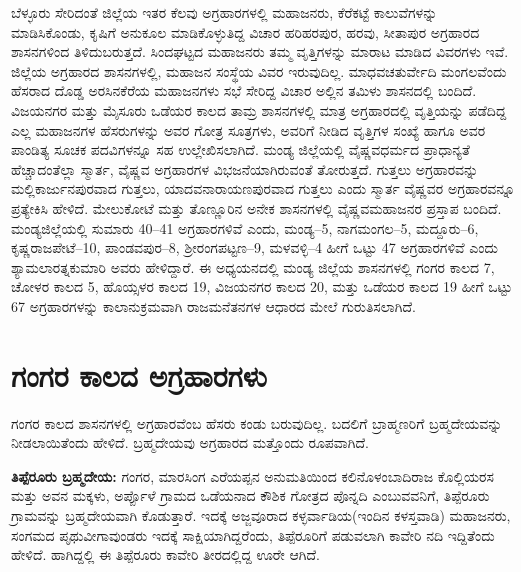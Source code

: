 ಬೆಳ್ಳೂರು ಸೇರಿದಂತೆ ಜಿಲ್ಲೆಯ ಇತರ ಕೆಲವು ಅಗ್ರಹಾರಗಳಲ್ಲಿ ಮಹಾಜನರು, ಕೆರೆಕಟ್ಟೆ ಕಾಲುವೆಗಳನ್ನು ಮಾಡಿಸಿಕೊಂಡು, ಕೃಷಿಗೆ ಅನುಕೂಲ ಮಾಡಿಕೊಳ್ಳುತಿದ್ದ ವಿಚಾರ ಹರಿಹರಪುರ, ಹರವು, ಸೀತಾಪುರ ಅಗ್ರಹಾರದ ಶಾಸನಗಳಿಂದ ತಿಳಿದುಬರುತ್ತದೆ. ಸಿಂದಘಟ್ಟದ ಮಹಾಜನರು ತಮ್ಮ ವೃತ್ತಿಗಳನ್ನು ಮಾರಾಟ ಮಾಡಿದ ವಿವರಗಳು ಇವೆ. ಜಿಲ್ಲೆಯ ಅಗ್ರಹಾರದ ಶಾಸನಗಳಲ್ಲಿ, ಮಹಾಜನ ಸಂಸ್ಥೆಯ ವಿವರ ಇರುವುದಿಲ್ಲ. ಮಾಧವಚತುರ್ವೇದಿ ಮಂಗಲವೆಂದು ಹೆಸರಾದ ದೊಡ್ಡ ಅರಸಿನಕೆರೆಯ ಮಹಾಜನಗಳು ಸಭೆ ಸೇರಿದ್ದ ವಿಚಾರ ಅಲ್ಲಿನ ತಮಿಳು ಶಾಸನದಲ್ಲಿ ಬಂದಿದೆ. ವಿಜಯನಗರ ಮತ್ತು ಮೈಸೂರು ಒಡೆಯರ ಕಾಲದ ತಾಮ್ರ ಶಾಸನಗಳಲ್ಲಿ ಮಾತ್ರ ಅಗ್ರಹಾರದಲ್ಲಿ ವೃತ್ತಿಯನ್ನು ಪಡೆದಿದ್ದ ಎಲ್ಲ ಮಹಾಜನಗಳ ಹೆಸರುಗಳನ್ನು ಅವರ ಗೋತ್ರ ಸೂತ್ರಗಳು, ಅವರಿಗೆ ನೀಡಿದ ವೃತ್ತಿಗಳ ಸಂಖ್ಯೆ ಹಾಗೂ ಅವರ ಪಾಂಡಿತ್ಯ ಸೂಚಕ ಪದವಿಗಳನ್ನೂ ಸಹ ಉಲ್ಲೇಖಿಸಲಾಗಿದೆ. ಮಂಡ್ಯ ಜಿಲ್ಲೆಯಲ್ಲಿ ವೈಷ್ಣವಧರ್ಮದ ಪ್ರಾಧಾನ್ಯತೆ ಹೆಚ್ಚಾದಂತೆಲ್ಲಾ ಸ್ಮಾರ್ತ, ವೈಷ್ಣವ ಅಗ್ರಹಾರಗಳ ವಿಭಜನೆಯಾಗಿರುವಂತೆ ತೋರುತ್ತದೆ. ಗುತ್ತಲು ಅಗ್ರಹಾರವನ್ನು ಮಲ್ಲಿಕಾರ್ಜುನಪುರವಾದ ಗುತ್ತಲು, ಯಾದವನಾರಾಯಣಪುರವಾದ ಗುತ್ತಲು ಎಂದು ಸ್ಮಾರ್ತ ವೈಷ್ಣವರ ಅಗ್ರಹಾರವನ್ನೂ ಪ್ರತ್ಯೇಕಿಸಿ ಹೇಳಿದೆ. ಮೇಲುಕೋಟೆ ಮತ್ತು ತೊಣ್ಣೂರಿನ ಅನೇಕ ಶಾಸನಗಳಲ್ಲಿ ವೈಷ್ಣವಮಹಾಜನರ ಪ್ರಸ್ತಾಪ ಬಂದಿದೆ. ಮಂಡ್ಯಜಿಲ್ಲೆಯಲ್ಲಿ ಸುಮಾರು 40–41 ಅಗ್ರಹಾರಗಳಿವೆ ಎಂದು, ಮಂಡ್ಯ–5, ನಾಗಮಂಗಲ–5, ಮದ್ದೂರು–6, ಕೃಷ್ಣರಾಜಪೇಟೆ–10, ಪಾಂಡವಪುರ–8, ಶ‍್ರೀರಂಗಪಟ್ಟಣ–9, ಮಳವಳ್ಳಿ–4 ಹೀಗೆ ಒಟ್ಟು 47 ಅಗ್ರಹಾರಗಳಿವೆ ಎಂದು ಶ್ಯಾಮಲಾರತ್ನಕುಮಾರಿ ಅವರು ಹೇಳಿದ್ದಾರೆ. ಈ ಅಧ್ಯಯನದಲ್ಲಿ ಮಂಡ್ಯ ಜಿಲ್ಲೆಯ ಶಾಸನಗಳಲ್ಲಿ ಗಂಗರ ಕಾಲದ 7, ಚೋಳರ ಕಾಲದ 5, ಹೊಯ್ಸಳರ ಕಾಲದ 19, ವಿಜಯನಗರ ಕಾಲದ 20, ಮತ್ತು ಒಡೆಯರ ಕಾಲದ 19 ಹೀಗೆ ಒಟ್ಟು 67 ಅಗ್ರಹಾರಗಳನ್ನು ಕಾಲಾನುಕ್ರಮವಾಗಿ ರಾಜಮನೆತನಗಳ ಆಧಾರದ ಮೇಲೆ ಗುರುತಿಸಲಾಗಿದೆ.


\section{ಗಂಗರ ಕಾಲದ ಅಗ್ರಹಾರಗಳು}

ಗಂಗರ ಕಾಲದ ಶಾಸನಗಳಲ್ಲಿ ಅಗ್ರಹಾರವೆಂಬ ಹೆಸರು ಕಂಡು ಬರುವುದಿಲ್ಲ. ಬದಲಿಗೆ ಬ್ರಾಹ್ಮಣರಿಗೆ ಬ್ರಹ್ಮದೇಯವನ್ನು ನೀಡಲಾಯಿತೆಂದು ಹೇಳಿದೆ. ಬ್ರಹ್ಮದೇಯವು ಅಗ್ರಹಾರದ ಮತ್ತೊಂದು ರೂಪವಾಗಿದೆ.

\textbf{ತಿಪ್ಪೆರೂರು ಬ್ರಹ್ಮದೇಯ:} ಗಂಗರ, ಮಾರಸಿಂಗ ಎರೆಯಪ್ಪನ ಅನುಮತಿಯಿಂದ ಕಲಿನೊಳಂಬಾದಿರಾಜ ಕೊಲ್ಲಿಯರಸ ಮತ್ತು ಅವನ ಮಕ್ಕಳು, ಅರ್ಪ್ಪೊಳೆ ಗ್ರಾಮದ ಒಡೆಯನಾದ ಕೌಶಿಕ ಗೋತ್ರದ ಪೊನ್ನದಿ ಎಂಬುವವನಿಗೆ, ತಿಪ್ಪೆರೂರು ಗ್ರಾಮವನ್ನು ಬ್ರಹ್ಮದೇಯವಾಗಿ ಕೊಡುತ್ತಾರೆ. ಇದಕ್ಕೆ ಅಜ್ಜವೂರಾದ ಕಳ್ಳರ್ವಾಡಿಯ(ಇಂದಿನ ಕಳಸ್ತವಾಡಿ) ಮಹಾಜನರು, ಸಂಗಮದ ಪೃಥುವೀಗಾವುಂಡರು ಇದಕ್ಕೆ ಸಾಕ್ಷಿಯಾಗಿದ್ದರೆಂದು, ತಿಪ್ಪೆರೂರಿಗೆ ಪಡುವಲಾಗಿ ಕಾವೇರಿ ನದಿ ಇದ್ದಿತೆಂದು ಹೇಳಿದೆ. ಹಾಗಿದ್ದಲ್ಲಿ ಈ ತಿಪ್ಪೆರೂರು ಕಾವೇರಿ ತೀರದಲ್ಲಿದ್ದ ಊರೇ ಆಗಿದೆ.

